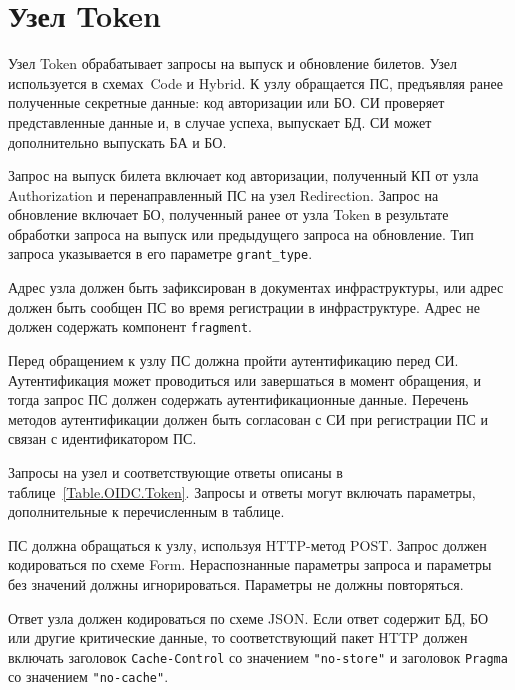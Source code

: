 \section{Узел Token}\label{OIDC.Token}

Узел Token обрабатывает запросы на выпуск и обновление билетов.
%
Узел используется в схемах~Code и Hybrid. 
% 
К узлу обращается ПС, предъявляя ранее полученные секретные данные:
код авторизации или БО.
%
СИ проверяет представленные данные и, в случае успеха, выпускает БД.
СИ может дополнительно выпускать БА и БО.

Запрос на выпуск билета включает код авторизации, полученный КП от узла 
Authorization и перенаправленный ПС на узел Redirection. 
%
Запрос на обновление включает БО, полученный ранее от узла Token в результате 
обработки запроса на выпуск или предыдущего запроса на обновление.
%
Тип запроса указывается в его параметре \lstinline{grant_type}.

Адрес узла должен быть зафиксирован в документах инфраструктуры,
или адрес должен быть сообщен ПС во время регистрации в инфраструктуре.
%
Адрес не должен содержать компонент \lstinline{fragment}.

Перед обращением к узлу ПС должна пройти аутентификацию перед СИ. 
Аутентификация может проводиться или завершаться в момент обращения,
и тогда запрос ПС должен содержать аутентификационные данные. 
%
Перечень методов аутентификации должен быть согласован с СИ при 
регистрации ПС и связан с идентификатором ПС.

Запросы на узел и соответствующие ответы описаны в 
таблице~\ref{Table.OIDC.Token}. 
%
Запросы и ответы могут включать параметры, дополнительные к перечисленным в 
таблице.

ПС должна обращаться к узлу, используя HTTP-метод POST.
%
Запрос должен кодироваться по схеме Form.
%
Нераспознанные параметры запроса и параметры без значений должны 
игнорироваться.
%
Параметры не должны повторяться.

Ответ узла должен кодироваться по схеме JSON. 
%
Если ответ содержит БД, БО или другие критические данные, то соответствующий 
пакет HTTP должен включать заголовок \lstinline{Cache-Control} со значением
\lstinline{"no-store"} и заголовок \lstinline{Pragma} со значением 
\lstinline{"no-cache"}.

